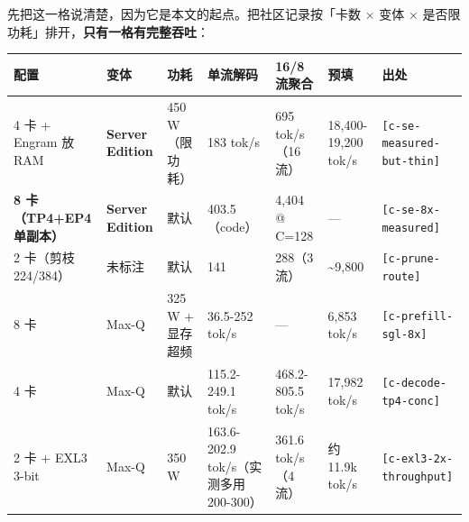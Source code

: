 先把这一格说清楚，因为它是本文的起点。把社区记录按「卡数 × 变体 × 是否限功耗」排开，\textbf{只有一格有完整吞吐}：


\begin{table}[t]
\centering
\footnotesize
\setlength{\tabcolsep}{4pt}
\label{tab:6}
\begin{tabularx}{\textwidth}{lllXlll}
\toprule
配置 & 变体 & 功耗 & 单流解码 & 16/8 流聚合 & 预填 & 出处 \\
\midrule
4 卡 + Engram 放 RAM & \textbf{Server Edition} & 450 W（限功耗） & 183 tok/s & 695 tok/s（16 流） & 18,400-\hspace{0pt}19,200 tok/s & {\scriptsize\texttt{[c-\hspace{0pt}se-\hspace{0pt}measured-\hspace{0pt}but-\hspace{0pt}thin]}} \\
\textbf{8 卡（TP4+EP4 单副本）} & \textbf{Server Edition} & 默认 & 403.5（code） & 4,404 @ C=128 & — & {\scriptsize\texttt{[c-\hspace{0pt}se-\hspace{0pt}8x-\hspace{0pt}measured]}} \\
2 卡（剪枝 224/384） & 未标注 & 默认 & 141 & 288（3 流） & \textasciitilde{}9,800 & {\scriptsize\texttt{[c-\hspace{0pt}prune-\hspace{0pt}route]}} \\
8 卡 & Max-Q & 325 W + 显存超频 & 36.5-\hspace{0pt}252 tok/s & — & 6,853 tok/s & {\scriptsize\texttt{[c-\hspace{0pt}prefill-\hspace{0pt}sgl-\hspace{0pt}8x]}} \\
4 卡 & Max-Q & 默认 & 115.2-\hspace{0pt}249.1 tok/s & 468.2-\hspace{0pt}805.5 tok/s & 17,982 tok/s & {\scriptsize\texttt{[c-\hspace{0pt}decode-\hspace{0pt}tp4-\hspace{0pt}conc]}} \\
2 卡 + EXL3 3-bit & Max-Q & 350 W & 163.6-\hspace{0pt}202.9 tok/s（实测多用 200-\hspace{0pt}300） & 361.6 tok/s（4 流） & 约 11.9k tok/s & {\scriptsize\texttt{[c-\hspace{0pt}exl3-\hspace{0pt}2x-\hspace{0pt}throughput]}} \\
\bottomrule
\end{tabularx}
\end{table}

